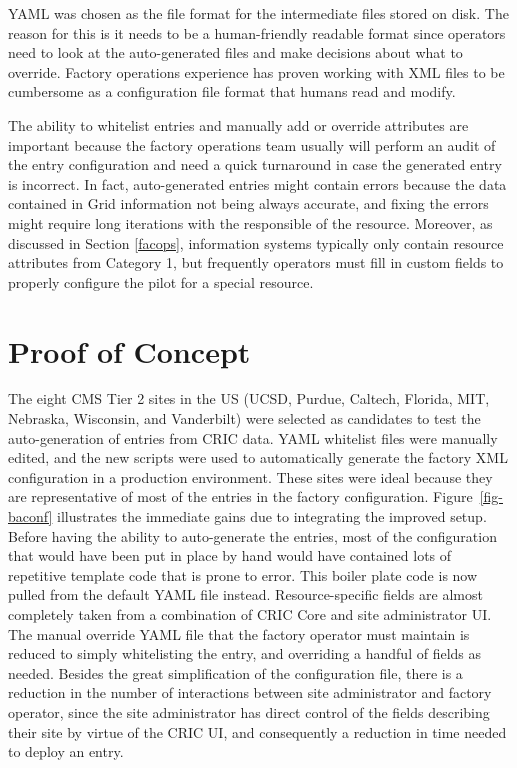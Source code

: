 \documentclass{webofc}
\begin{document}
YAML was chosen as the file format for the intermediate files stored on disk. The reason for this is it needs to be a human-friendly readable format since operators need to look at the auto-generated files and make decisions about what to override. Factory operations experience has proven working with XML files to be cumbersome as a configuration file format that humans read and modify.

The ability to whitelist entries and manually add or override attributes are important because the factory operations team usually will perform an audit of the entry configuration and need a quick turnaround in case the generated entry is incorrect. In fact, auto-generated entries might contain errors because the data contained in Grid information not being always accurate, and fixing the errors might require long iterations with the responsible of the resource. Moreover, as discussed in Section \ref{facops}, information systems typically only contain resource attributes from Category 1, but frequently operators must fill in custom fields to properly configure the pilot for a special resource.


\section{Proof of Concept}
\label{proof}

The eight CMS Tier 2 sites in the US (UCSD, Purdue, Caltech, Florida, MIT, Nebraska, Wisconsin, and Vanderbilt) were selected as candidates to test the auto-generation of entries from CRIC data. YAML whitelist files were manually edited, and the new scripts were used to automatically generate the factory XML configuration in a production environment. These sites were ideal because they are representative of most of the entries in the factory configuration. Figure~\ref{fig-baconf} illustrates the immediate gains due to integrating the improved setup. Before having the ability to auto-generate the entries, most of the configuration that would have been put in place by hand would have contained lots of repetitive template code that is prone to error. This boiler plate code is now pulled from the default YAML file instead. Resource-specific fields are almost completely taken from a combination of CRIC Core and site administrator UI. The manual override YAML file that the factory operator must maintain is reduced to simply whitelisting the entry, and overriding a handful of fields as needed. Besides the great simplification of the configuration file, there is a reduction in the number of interactions between site administrator and factory operator, since the site administrator has direct control of the fields describing their site by virtue of the CRIC UI, and consequently a reduction in time needed to deploy an entry.
\end{document}
